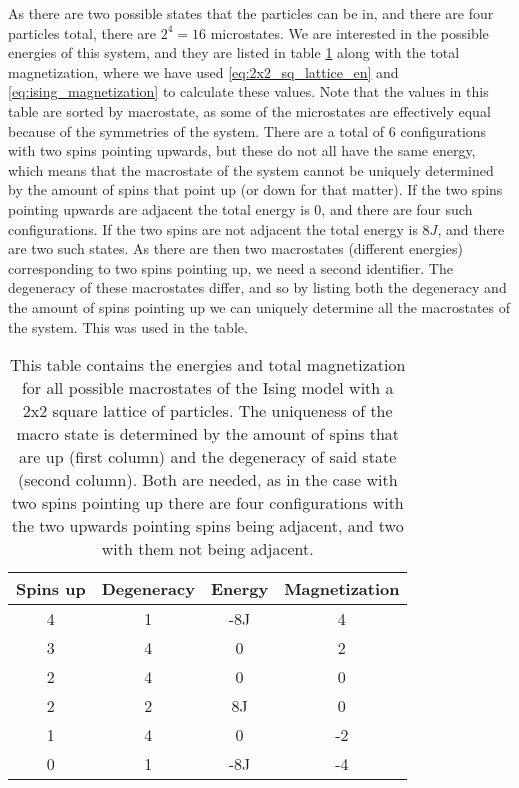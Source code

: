\documentclass[reprint,english,notitlepage]{revtex4-1}  %
\begin{document}
As there are two possible states that the particles can be in, and there are four particles total, there are $2^4 = 16$ microstates. We are interested in the possible energies of this system, and they are listed in table \ref{table:2x2_sq_lattice_en_and_mag} along with the total magnetization, where we have used \eqref{eq:2x2_sq_lattice_en} and \eqref{eq:ising_magnetization} to calculate these values. Note that the values in this table are sorted by macrostate, as some of the microstates are effectively equal because of the symmetries of the system. There are a total of 6 configurations with two spins pointing upwards, but these do not all have the same energy, which means that the macrostate of the system cannot be uniquely determined by the amount of spins that point up (or down for that matter). If the two spins pointing upwards are adjacent the total energy is 0, and there are four such configurations. If the two spins are not adjacent the total energy is $8J$, and there are two such states. As there are then two macrostates (different energies) corresponding to two spins pointing up, we need a second identifier. The degeneracy of these macrostates differ, and so by listing both the degeneracy and the amount of spins pointing up we can uniquely determine all the macrostates of the system. This was used in the table.

\begin{table}[H]
\centering
\caption{This table contains the energies and total magnetization for all possible macrostates of the Ising model with a 2x2 square lattice of particles. The uniqueness of the macro state is determined by the amount of spins that are up (first column) and the degeneracy of said state (second column). Both are needed, as in the case with two spins pointing up there are four configurations with the two upwards pointing spins being adjacent, and two with them not being adjacent.} \label{table:2x2_sq_lattice_en_and_mag}
\begin{tabular}{|c|c|c|c|}
\hline
Spins up & Degeneracy & Energy & Magnetization \\
\hline
4 & 1 & -8J & 4 \\
3 & 4 & 0 & 2 \\
2 & 4 & 0 & 0 \\
2 & 2 & 8J & 0 \\
1 & 4 & 0 & -2 \\
0 & 1 & -8J & -4 \\
\hline
\end{tabular}
\end{table}
\end{document}
